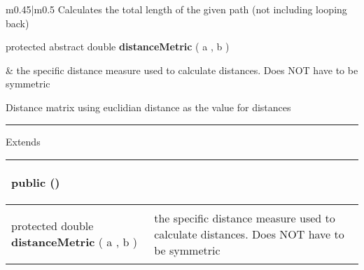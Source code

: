 {\begin{tabularx}{\linewidth}{m{0.45\textwidth}|m{0.5\textwidth}}
 Calculates the total length of the given path (not including looping back)\\ \hline 
\begin{raggedleft}protected abstract double \textbf{distanceMetric }(\newline \hfill 
\hspace*{ 5pt} \textbf{\hyperref[tab:Sensor]{\color{blue}{Sensor}}} a , \newline
 \hspace*{ 5pt} \textbf{\hyperref[tab:Sensor]{\color{blue}{Sensor}}} b  )
\end{raggedleft} &
 the specific distance measure used to calculate distances. Does NOT have to be symmetric\\\end{tabularx}
}
 {\scriptsize Distance matrix using euclidian distance as the value for distances
 
\vspace*{4pt} \hrule \vspace*{3pt}
Extends \textbf{ \hyperref[tab:DistanceMatrix]{\color{blue}{DistanceMatrix}} }
\vspace*{-5pt} 
\begin{tabularx}{\linewidth}{m{}|m{}}
\label{tab:EuclidianDistanceMatrix}
\begin{raggedleft}public  \textbf{\hyperref[tab:EuclidianDistanceMatrix]{\color{blue}{EuclidianDistanceMatrix}}}()
\end{raggedleft} &
 \\ \hline 
\begin{raggedleft}protected double \textbf{distanceMetric }(\newline \hfill 
\hspace*{ 5pt} \textbf{\hyperref[tab:Sensor]{\color{blue}{Sensor}}} a , \newline
 \hspace*{ 5pt} \textbf{\hyperref[tab:Sensor]{\color{blue}{Sensor}}} b  )
\end{raggedleft} &
 the specific distance measure used to calculate distances. Does NOT have to be symmetric\\\end{tabularx}
}
